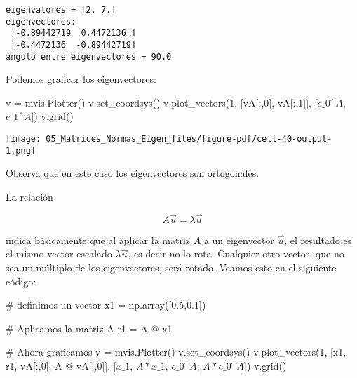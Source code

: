 \documentclass[
  letterpaper,
  DIV=11,
  numbers=noendperiod]{scrreprt}
\newenvironment{Shaded}{\begin{snugshade}}{\end{snugshade}}
\newcommand{\CommentTok}[1]{\textcolor[rgb]{0.37,0.37,0.37}{#1}}
\newcommand{\DecValTok}[1]{\textcolor[rgb]{0.68,0.00,0.00}{#1}}
\newcommand{\FloatTok}[1]{\textcolor[rgb]{0.68,0.00,0.00}{#1}}
\newcommand{\NormalTok}[1]{\textcolor[rgb]{0.00,0.23,0.31}{#1}}
\newcommand{\OperatorTok}[1]{\textcolor[rgb]{0.37,0.37,0.37}{#1}}
\newcommand{\StringTok}[1]{\textcolor[rgb]{0.13,0.47,0.30}{#1}}
\begin{document}
\begin{verbatim}
eigenvalores = [2. 7.]
eigenvectores:
 [-0.89442719  0.4472136 ] 
 [-0.4472136  -0.89442719]
ángulo entre eigenvectores = 90.0
\end{verbatim}

Podemos graficar los eigenvectores:

\begin{Shaded}
\begin{Highlighting}[]
\NormalTok{v }\OperatorTok{=}\NormalTok{ mvis.Plotter()}
\NormalTok{v.set\_coordsys()}
\NormalTok{v.plot\_vectors(}\DecValTok{1}\NormalTok{, [vA[:,}\DecValTok{0}\NormalTok{], vA[:,}\DecValTok{1}\NormalTok{]], [}\StringTok{\textquotesingle{}$e\_0\^{}A$\textquotesingle{}}\NormalTok{,}\StringTok{\textquotesingle{}$e\_1\^{}A$\textquotesingle{}}\NormalTok{])}
\NormalTok{v.grid()}
\end{Highlighting}
\end{Shaded}

\texttt{[image: 05\_Matrices\_Normas\_Eigen\_files/figure-pdf/cell-40-output-1.png]}

Observa que en este caso los eigenvectores son ortogonales.

La relación

\[
A \vec{u} = \lambda \vec{u}
\]

indica básicamente que al aplicar la matriz \(A\) a un eigenvector
\(\vec{u}\), el resultado es el mismo vector escalado
\(\lambda \vec{u}\), es decir no lo rota. Cualquier otro vector, que no
sea un múltiplo de los eigenvectores, será rotado. Veamos esto en el
siguiente código:

\begin{Shaded}
\begin{Highlighting}[]
\CommentTok{\# definimos un vector}
\NormalTok{x1 }\OperatorTok{=}\NormalTok{ np.array([}\FloatTok{0.5}\NormalTok{,}\FloatTok{0.1}\NormalTok{])}

\CommentTok{\# Aplicamos la matriz A}
\NormalTok{r1 }\OperatorTok{=}\NormalTok{ A }\OperatorTok{@}\NormalTok{ x1}

\CommentTok{\# Ahora graficamos}
\NormalTok{v }\OperatorTok{=}\NormalTok{ mvis.Plotter()}
\NormalTok{v.set\_coordsys()}
\NormalTok{v.plot\_vectors(}\DecValTok{1}\NormalTok{, [x1, r1, vA[:,}\DecValTok{0}\NormalTok{], A }\OperatorTok{@}\NormalTok{ vA[:,}\DecValTok{0}\NormalTok{]], }
\NormalTok{                  [}\StringTok{\textquotesingle{}$x\_1$\textquotesingle{}}\NormalTok{, }\StringTok{\textquotesingle{}$A * x\_1$\textquotesingle{}}\NormalTok{, }\StringTok{\textquotesingle{}$e\_0\^{}A$\textquotesingle{}}\NormalTok{, }\StringTok{\textquotesingle{}$A * e\_0\^{}A$\textquotesingle{}}\NormalTok{])}
\NormalTok{v.grid()}
\end{Highlighting}
\end{Shaded}
\end{document}
